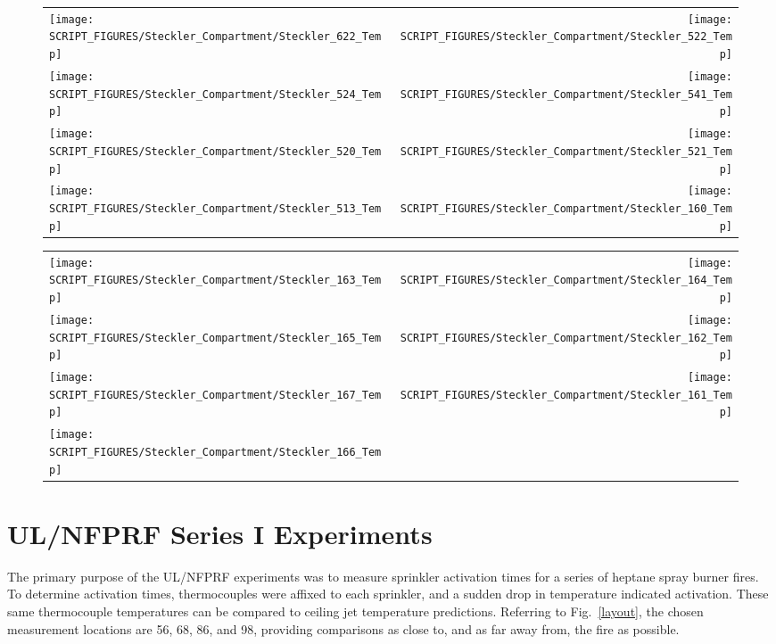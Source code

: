 \begin{figure}[p]
\begin{tabular*}{\textwidth}{l@{\extracolsep{\fill}}r}
\texttt{[image: SCRIPT\_FIGURES/Steckler\_Compartment/Steckler\_622\_Temp]} &
\texttt{[image: SCRIPT\_FIGURES/Steckler\_Compartment/Steckler\_522\_Temp]} \\
 \texttt{[image: SCRIPT\_FIGURES/Steckler\_Compartment/Steckler\_524\_Temp]} &
\texttt{[image: SCRIPT\_FIGURES/Steckler\_Compartment/Steckler\_541\_Temp]} \\
\texttt{[image: SCRIPT\_FIGURES/Steckler\_Compartment/Steckler\_520\_Temp]} &
\texttt{[image: SCRIPT\_FIGURES/Steckler\_Compartment/Steckler\_521\_Temp]} \\
\texttt{[image: SCRIPT\_FIGURES/Steckler\_Compartment/Steckler\_513\_Temp]} &
\texttt{[image: SCRIPT\_FIGURES/Steckler\_Compartment/Steckler\_160\_Temp]}
\end{tabular*}
\label{Steckler_Temp_6}
\end{figure}

\begin{figure}[p]
\begin{tabular*}{\textwidth}{l@{\extracolsep{\fill}}r}
\texttt{[image: SCRIPT\_FIGURES/Steckler\_Compartment/Steckler\_163\_Temp]} &
\texttt{[image: SCRIPT\_FIGURES/Steckler\_Compartment/Steckler\_164\_Temp]} \\
\texttt{[image: SCRIPT\_FIGURES/Steckler\_Compartment/Steckler\_165\_Temp]} &
\texttt{[image: SCRIPT\_FIGURES/Steckler\_Compartment/Steckler\_162\_Temp]} \\
\texttt{[image: SCRIPT\_FIGURES/Steckler\_Compartment/Steckler\_167\_Temp]} &
\texttt{[image: SCRIPT\_FIGURES/Steckler\_Compartment/Steckler\_161\_Temp]} \\
\texttt{[image: SCRIPT\_FIGURES/Steckler\_Compartment/Steckler\_166\_Temp]} &
\end{tabular*}
\label{Steckler_Temp_7}
\end{figure}

\clearpage

\section{UL/NFPRF Series I Experiments}

The primary purpose of the UL/NFPRF experiments was to measure sprinkler activation times for a series of heptane spray burner fires. To determine activation times, thermocouples were affixed to each sprinkler, and a sudden drop in temperature indicated activation. These same thermocouple temperatures can be compared to ceiling jet temperature predictions. Referring to Fig.~\ref{layout}, the chosen measurement locations are 56, 68, 86, and 98, providing comparisons as close to, and as far away from, the fire as possible.


